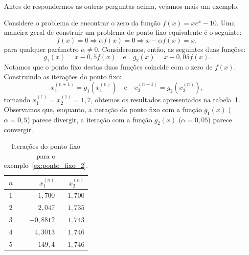
Antes de respondermos as outras perguntas acima, vejamos mais um exemplo.

\begin{ex}\label{ex:ponto_fixo_2}
  Considere o problema de encontrar o zero da função $f(x) = xe^x - 10$. Uma maneira geral de construir um problema de ponto fixo equivalente é o seguinte:
  \begin{equation*}
    f(x) = 0 \Rightarrow \alpha f(x) = 0 \Rightarrow x - \alpha f(x) = x,
  \end{equation*}
para qualquer parâmetro $\alpha\neq 0$. Consideremos, então, as seguintes duas funções:
\begin{equation*}
  g_1(x) = x - 0,5f(x)\quad\text{e}\quad g_2(x) = x - 0,05f(x).
\end{equation*}
Notamos que o ponto fixo destas duas funções coincide com o zero de $f(x)$. Construindo as iterações do ponto fixo:
\begin{equation*}
  x_1^{(n+1)} = g_1(x_1^{(n)})\quad\text{e}\quad x_2^{(n+1)} = g_2(x_2^{(n)}),
\end{equation*}
tomando $x_1^{(1)} = x_2^{(1)} = 1,7$, obtemos os resultados apresentados na tabela~\ref{tab:ponto_fixo_2}. Observamos que, enquanto, a iteração do ponto fixo com a função $g_1(x)$ ($\alpha = 0,5$) parece divergir, a iteração com a função $g_2(x)$ ($\alpha = 0,05$) parece convergir.

\begin{table}
  \centering
  \caption{Iterações do ponto fixo para o exemplo~\ref{ex:ponto_fixo_2}.}\label{tab:ponto_fixo_2}
  \begin{tabular}{c|rr}\hline
    $n$ & $x_1^{(n)}$ & $x_2^{(n)}$ \\\hline
    $1$ & $1,700$ & $1,700$\\
    $2$ & $2,047$ & $1,735$\\
    $3$ & $-0,8812$ & $1,743$ \\
    $4$ & $4,3013$ & $1,746$\\
    $5$ & $-149,4$ & $1,746$\\\hline
  \end{tabular}
\end{table}


\end{ex}
